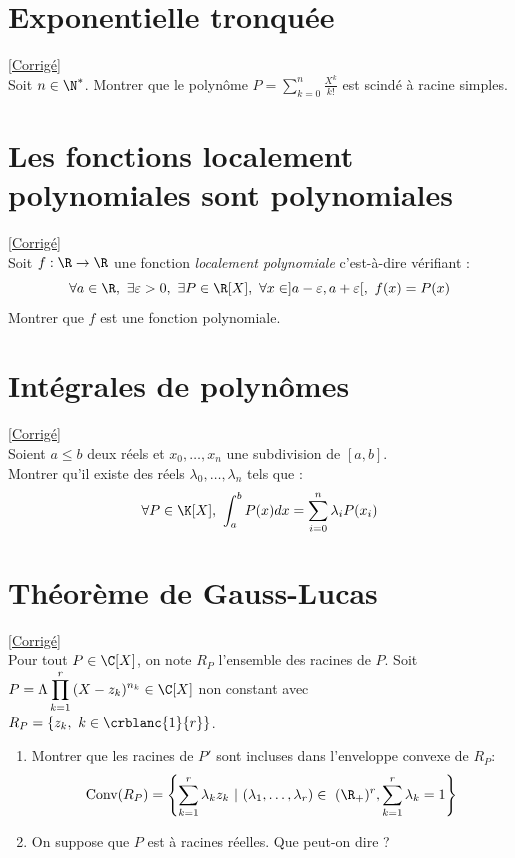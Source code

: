 \documentclass{book}
\begin{document}
	\section{Exponentielle tronquée }
	\textcolor{blue}{\hyperref[sec:exponentielle-tronquée]{[Corrigé]}}\\
	\label{Exponentielle tronquée}
	Soit $n\in \N^*$. Montrer que le polynôme $P=\displaystyle\sum_{k=0}^n\frac{X^k}{k!}$ est scindé à racine simples.
	
	\section{Les fonctions localement polynomiales sont polynomiales }
	\textcolor{blue}{\hyperref[sec:les-fonctions-localement-polynomiales-sont-polynomiales]{[Corrigé]}}\\
	\label{Les fonctions localement polynomiales sont polynomiales}
	Soit $f:\R\to\R$ une fonction \textit{localement polynomiale} c'est-à-dire vérifiant :
	$$\forall a\in \R,\ \exists\varepsilon>0,\ \exists P\in \R[X],\ \forall x\in ]a-\varepsilon,a+\varepsilon[,\ f(x)=P(x)$$
	Montrer que $f$ est une fonction polynomiale.
	
	\section{Intégrales de polynômes }
	\textcolor{blue}{\hyperref[sec:integrales-de-polynomes-etoile1]{[Corrigé]}}\\
	\label{Intégrales de polynômes}
	Soient $a\leq b$ deux réels et $x_0,\dots,x_n$ une subdivision de $[a,b]$.\\
	Montrer qu'il existe des réels $\lambda_0,\dots,\lambda_n$ tels que :
	$$\forall P\in \K[X],\ \int_a^bP(x)dx=\sum_{i=0}^n\lambda_iP(x_i)$$
	
	\section{Théorème de Gauss-Lucas }
	\textcolor{blue}{\hyperref[sec:theoreme-de-gauss-lucas-etoile2]{[Corrigé]}}\\
	\label{Théorème de Gauss-Lucas}
	Pour tout $P\in \C[X]$, on note $R_P$ l'ensemble des racines de $P$. Soit $P=\Lambda\displaystyle\prod\limits_{k=1}^r{(X-z_k)^{n_k}} \in\C[X]$ non constant avec $R_P=\{z_k,\ k\in\crblanc{1}{r}\}$.
	\begin{enumerate}
		\item Montrer que les racines de $P'$ sont incluses dans l'enveloppe convexe de $R_P$: $$\text{Conv}(R_P)=\left\{\displaystyle\sum\limits_{k=1}^r{\lambda_kz_k}\ |\ (\lambda_1,\dots,\lambda_r)\in \ (\R_+)^r,\displaystyle\sum\limits_{k=1}^r{\lambda_k}=1\right\}$$
		\item On suppose que $P$ est à racines réelles. Que peut-on dire ?
	\end{enumerate}
	
\end{document}
